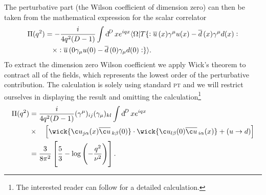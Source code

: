 \documentclass[../../index.tex]{subfiles}
\begin{document}
The perturbative part (the Wilson coefficient of dimension zero) can then be
taken from the mathematical expression for the scalar correlator
\begin{equation}
  \label{eq:rhoScalarCorrelator}
  \begin{split}
    \Pi(q^2) &= - \frac{i}{4 q^2 (D -1)} \int \dif^D x e^{iqx} \langle \Omega \vert T \{:\anti{u}(x) \gamma^\mu u(x) - \anti{d}(x) \gamma^\mu d(x): \\
    &\quad\times :\anti{u}(0 \gamma_\mu u(0) - \anti{d}(0)\gamma_\mu d(0): \}
    \rangle.
  \end{split}
\end{equation}
To extract the dimension zero Wilson coefficient we apply Wick's theorem to
contract all of the fields, which represents the lowest order of the
perturbative contribution. The calculation is solely using standard \textsc{pt}
and we will restrict ourselves in displaying the result and omitting the
calculation\footnote{The interested reader can follow \cite{Pascual1984} for a
  detailed calculation.}
\begin{equation}
  \begin{split}
    \Pi(q^2) &= \frac{i}{4q^2(D-1)} (\gamma^\mu)_{ij} (\gamma_\mu)_{kl} \int \dif^D x e^{iqx} \\
    &\times\quad\left[ \wick{ \c u_{j \alpha}(x) \anti{\c u}_{k \beta}(0)} \cdot
      \wick{\c u_{l \beta}(0) \anti{\c u}_{i \alpha}(x)} + (u \to d)
    \right] \\
    &= \frac{3}{8\pi^2} \left[ \frac{5}{3} - \log\left( -\frac{q^2}{\nu^2}
      \right) \right].
  \end{split}
\end{equation}
\end{document}
